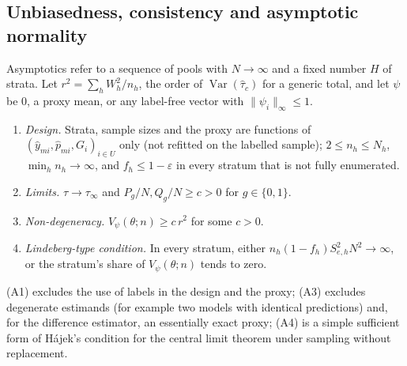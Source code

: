 \subsection{Unbiasedness, consistency and asymptotic normality}\label{sec:theory-asym}

Asymptotics refer to a sequence of pools with $N\to\infty$ and a fixed number $H$ of strata. Let
$r^2=\sum_hW_h^2/n_h$, the order of $\operatorname{Var}(\hat\tau_c)$ for a generic total, and let $\psi$ be $0$,
a proxy mean, or any label-free vector with $\|\psi_i\|_\infty\le1$.

\begin{assumption}\label{prop:assumptions}
\begin{enumerate}
\item[(A1)] \emph{Design.} Strata, sample sizes and the proxy are functions of
$(\hat y_{mi},\hat p_{mi},G_i)_{i\in U}$ only (not refitted on the labelled sample); $2\le n_h\le N_h$,
$\min_hn_h\to\infty$, and $f_h\le 1-\varepsilon$ in every stratum that is not fully enumerated.
\item[(A2)] \emph{Limits.} $\tau\to\tau_\infty$ and $P_g/N,Q_g/N\ge c>0$ for $g\in\{0,1\}$.
\item[(A3)] \emph{Non-degeneracy.} $V_\psi(\theta;n)\ge c\,r^2$ for some $c>0$.
\item[(A4)] \emph{Lindeberg-type condition.} In every stratum, either
$n_h(1-f_h)S^2_{e,h}N^2\to\infty$, or the stratum's share of $V_\psi(\theta;n)$ tends to zero.
\end{enumerate}
\end{assumption}

(A1) excludes the use of labels in the design and the proxy; (A3) excludes degenerate estimands (for example two models with
identical predictions) and, for the difference estimator, an essentially exact proxy; (A4) is a simple sufficient form of
H\'ajek's \citeyearpar{hajek1960} condition for the central limit theorem under sampling without replacement.

